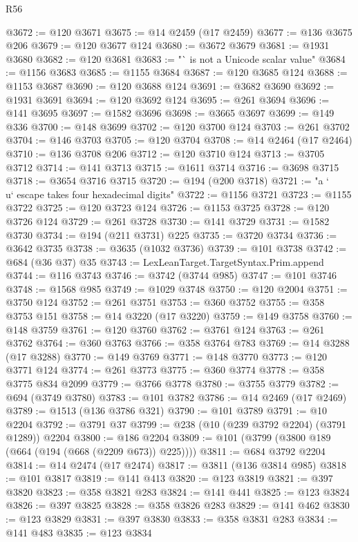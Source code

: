 \begin{lexlean}{R56}
\begin{coremodule}
@3672 := @120 @3671
@3675 := @14 @2459 (@17 @2459)
@3677 := @136 @3675 @206
@3679 := @120 @3677 @124
@3680 := @3672 @3679
@3681 := @1931 @3680
@3682 := @120 @3681
@3683 := "` is not a Unicode scalar value"
@3684 := @1156 @3683
@3685 := @1155 @3684
@3687 := @120 @3685 @124
@3688 := @1153 @3687
@3690 := @120 @3688 @124
@3691 := @3682 @3690
@3692 := @1931 @3691
@3694 := @120 @3692 @124
@3695 := @261 @3694
@3696 := @141 @3695
@3697 := @1582 @3696
@3698 := @3665 @3697
@3699 := @149 @336
@3700 := @148 @3699
@3702 := @120 @3700 @124
@3703 := @261 @3702
@3704 := @146 @3703
@3705 := @120 @3704
@3708 := @14 @2464 (@17 @2464)
@3710 := @136 @3708 @206
@3712 := @120 @3710 @124
@3713 := @3705 @3712
@3714 := @141 @3713
@3715 := @1611 @3714
@3716 := @3698 @3715
@3718 := @3654 @3716 @3715
@3720 := @194 (@200 @3718)
@3721 := "a `\\u` escape takes four hexadecimal digits"
@3722 := @1156 @3721
@3723 := @1155 @3722
@3725 := @120 @3723 @124
@3726 := @1153 @3725
@3728 := @120 @3726 @124
@3729 := @261 @3728
@3730 := @141 @3729
@3731 := @1582 @3730
@3734 := @194 (@211 @3731) @225
@3735 := @3720 @3734
@3736 := @3642 @3735
@3738 := @3635 (@1032 @3736)
@3739 := @101 @3738
@3742 := @684 (@36 @37) @35
@3743 := LexLeanTarget.TargetSyntax.Prim.append
@3744 := @116 @3743
@3746 := @3742 (@3744 @985)
@3747 := @101 @3746
@3748 := @1568 @985
@3749 := @1029 @3748
@3750 := @120 @2004
@3751 := @3750 @124
@3752 := @261 @3751
@3753 := @360 @3752
@3755 := @358 @3753 @151
@3758 := @14 @3220 (@17 @3220)
@3759 := @149 @3758
@3760 := @148 @3759
@3761 := @120 @3760
@3762 := @3761 @124
@3763 := @261 @3762
@3764 := @360 @3763
@3766 := @358 @3764 @783
@3769 := @14 @3288 (@17 @3288)
@3770 := @149 @3769
@3771 := @148 @3770
@3773 := @120 @3771 @124
@3774 := @261 @3773
@3775 := @360 @3774
@3778 := @358 @3775 @834 @2099
@3779 := @3766 @3778
@3780 := @3755 @3779
@3782 := @694 (@3749 @3780)
@3783 := @101 @3782
@3786 := @14 @2469 (@17 @2469)
@3789 := @1513 (@136 @3786 @321)
@3790 := @101 @3789
@3791 := @10 @2204
@3792 := @3791 @37
@3799 := @238 (@10 (@239 @3792 @2204) (@3791 @1289)) @2204
@3800 := @186 @2204
@3809 := @101 (@3799 (@3800 @189 (@664 (@194 (@668 (@2209 @673)) @225))))
@3811 := @684 @3792 @2204
@3814 := @14 @2474 (@17 @2474)
@3817 := @3811 (@136 @3814 @985)
@3818 := @101 @3817
@3819 := @141 @413
@3820 := @123 @3819
@3821 := @397 @3820
@3823 := @358 @3821 @283
@3824 := @141 @441
@3825 := @123 @3824
@3826 := @397 @3825
@3828 := @358 @3826 @283
@3829 := @141 @462
@3830 := @123 @3829
@3831 := @397 @3830
@3833 := @358 @3831 @283
@3834 := @141 @483
@3835 := @123 @3834

\end{coremodule}
\end{lexlean}
